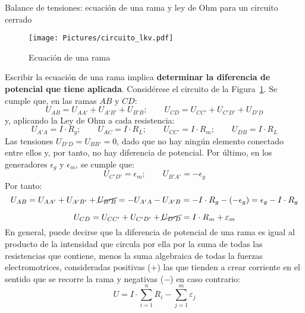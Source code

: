 \documentclass[11pt]{book} %
\makeatletter
\numberwithin{dummy}{section}
\theoremstyle{ocrenumbox}
\theoremstyle{blacknumex}
\theoremstyle{blacknumbox}
\theoremstyle{ocrenum}
\renewcommand{\subsection}{\@startsection {subsection}{2}{\z@}
{-3ex \@plus -0.1ex \@minus -.4ex}
{0.5ex \@plus.2ex }
{\normalfont\sffamily\bfseries}}
\makeatother
\begin{document}
	\subsection{Balance de tensiones: ecuación de una rama y ley de Ohm para un circuito cerrado}
	\begin{figure}[tbp]
		\centering
		\texttt{[image: Pictures/circuito\_lkv.pdf]}
		\caption{Ecuación de una rama}
		\label{fig.circuito_lkv}
	\end{figure}
	Escribir la ecuación de una rama implica \textbf{determinar la diferencia de potencial que tiene aplicada}. Considérese el circuito de la Figura~\ref{fig.circuito_lkv}. Se cumple que, en las ramas $AB$ y $CD$: 
	\begin{equation*}
		U_{AB} = U_{AA'} + U_{A'B'} + U_{B'B}; \qquad
		U_{CD} = U_{CC'} + U_{C'D'} + U_{D'D}
	\end{equation*}
	y, aplicando la Ley de Ohm a cada resistencia:
	\begin{equation*}
		U_{A'A} = I \cdot R_g; \qquad
		U_{AC} = I \cdot R_L; \qquad 
		U_{CC'} = I \cdot R_m; \qquad
		U_{DB} = I \cdot R_L
	\end{equation*}
	Las tensiones $U_{D'D}= U_{BB'} = 0$, dado que no hay ningún elemento conectado entre ellos y, por tanto, no hay diferencia de potencial. Por último, en los generadores $\epsilon_g$ y $\epsilon_m$, se cumple que:
	\begin{equation*}
		U_{C'D'} = \epsilon_m;\qquad
		U_{B'A'} = -\epsilon_g
	\end{equation*}
	Por tanto: 
	\begin{equation*}
		U_{AB} = U_{AA'} + U_{A'B'} + \cancel{U_{B'B}}=-U_{A'A}-U_{A'B}=-I \cdot R_g-(-\epsilon_g)=\epsilon_g-I \cdot R_g%
	\end{equation*}
	
	\begin{equation*}
		U_{CD} = U_{CC'} + U_{C'D'} + \cancel{U_{D'D}}=I \cdot R_m +\varepsilon_m%
	\end{equation*}
	En general, puede decirse que la diferencia de potencial de una rama es igual al producto de la intensidad que circula por ella por la suma de todas las resistencias que contiene, menos la suma algebraica de todas la
	fuerzas electromotrices, consideradas positivas ($+$) las que tienden a crear corriente en el sentido que se recorre la rama y negativas ($-$) en caso contrario:
	\begin{equation}\label{eq.ecuacion_rama}
		\boxed{U=I\cdot \sum_{i=1}^n R_i-\sum_{j=1}^m \varepsilon_j}
	\end{equation}
	
\end{document}
